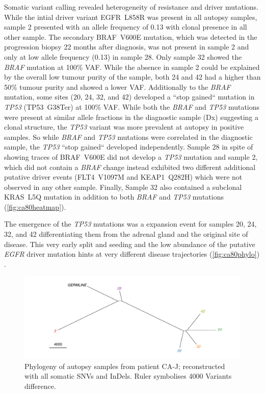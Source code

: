 Somatic variant calling revealed heterogeneity of resistance and driver mutations. While the intial driver variant EGFR~L858R was present in all autopsy samples, sample 2 presented with an allele frequency of 0.13 with clonal presence in all other sample. The secondary BRAF~V600E mutation, which was detected in the progression biopsy 22 months after diagnosis, was not present in sample 2 and only at low allele frequency (0.13) in sample 28. Only sample 32 showed the \textit{BRAF} mutation at 100\% VAF. While the absence in sample 2 could be explained by the overall low tumour purity of the sample, both 24 and 42 had a higher than 50\% tumour purity and showed a lower VAF. Additionally to the \textit{BRAF} mutation, some sites (20, 24, 32, and 42) developed a ``stop gained`` mutation in \textit{TP53} (TP53~G38Ter) at 100\% VAF. While both the \textit{BRAF} and \textit{TP53} mutations were present at similar allele fractions in the diagnostic sample (Dx) suggesting a clonal structure, the \textit{TP53} variant was more prevalent at autopsy in positive samples. So while \textit{BRAF} and \textit{TP53} mutations were correlated in the diagnostic sample, the \textit{TP53} ``stop gained`` developed independently.
Sample 28 in spite of showing traces of BRAF~V600E did not develop a \textit{TP53} mutation and sample 2, which did not contain a \textit{BRAF} change instead exhibited two different additional putative driver events (FLT4~V1097M and KEAP1~Q282H) which were not observed in any other sample. 
Finally, Sample 32 also contained a subclonal KRAS~L5Q mutation in addition to both \textit{BRAF} and \textit{TP53} mutations (\autoref{fig:ca80heatmap}). 

The emergence of the \textit{TP53} mutations was a expansion event for samples 20, 24, 32, and 42 differentiating them from the adrenal gland and the original site of disease. This very early split and seeding and the low abundance of the putative \textit{EGFR} driver mutation hints at very different disease trajectories (\autoref{fig:ca80phylo})	. 

\begin{figure}[ht]
	\centering
	\includegraphics[width=.99\linewidth]{Figures/CASCADE/CA80/CA80phylo.pdf}
	\caption[Phylogeny of autopsy samples from patient CA-J]{Phylogeny of autopsy samples from patient CA-J; reconstructed with all somatic SNVs and InDels. Ruler symbolises 4000 Variants difference.} \label{fig:ca80phylo}
\end{figure}


